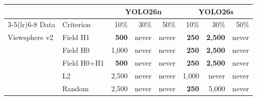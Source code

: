 \begin{tabular}{llrrrrrr}
\toprule
 & & \multicolumn{3}{c}{YOLO26n} & \multicolumn{3}{c}{YOLO26s} \\
\cmidrule(lr){3-5}\cmidrule(lr){6-8}
Data & Criterion & 10\% & 30\% & 50\% & 10\% & 30\% & 50\% \\
\midrule
Viewsphere v2 & Field H1 & \textbf{500} & never & never & \textbf{250} & \textbf{2,500} & never \\
 & Field H0 & 1,000 & never & never & \textbf{250} & \textbf{2,500} & never \\
 & Field H0+H1 & \textbf{500} & never & never & \textbf{250} & \textbf{2,500} & never \\
 & L2 & 2,500 & never & never & 1,000 & never & never \\
 & Random & 2,500 & never & never & \textbf{250} & 5,000 & never \\
\bottomrule
\end{tabular}

